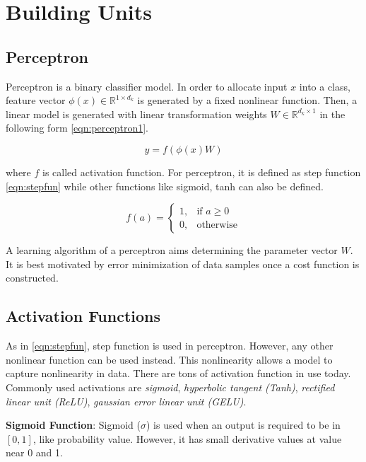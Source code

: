 \section{Building Units}
\label{sec:building_units}

\subsection{Perceptron}
Perceptron is a binary classifier model. In order to allocate input $x$ into a class, feature vector $\phi(x) \in \mathbb{R}^{1 \times d_k}$ is generated by a fixed nonlinear function. Then, a linear model is generated with linear transformation weights $W \in \mathbb{R}^{d_k \times 1} $ in the following form \ref{eqn:perceptron1}.

\begin{equation}
\label{eqn:perceptron1}
y = f(\phi(x) W)
\end{equation}

where $f$ is called activation function. For perceptron, it is defined as step function \ref{eqn:stepfun} while other functions like sigmoid, tanh can also be defined.

\begin{equation}
\label{eqn:stepfun}
f(a) = 
\begin{cases}
1,   & \text{if } a\geq 0\\
0,   & \text{otherwise}
\end{cases} 
\end{equation}

A learning algorithm of a perceptron aims determining the parameter vector $W$. It is best motivated by error minimization of data samples once a cost function is constructed. 

\subsection{Activation Functions}
As in \eqref{eqn:stepfun}, step function is used in perceptron. However, any other nonlinear function can be used instead. This nonlinearity allows a model to capture nonlinearity in data. There are tons of activation function in use today. Commonly used activations are \textit{sigmoid}, \textit{hyperbolic tangent (Tanh)}, \textit{rectified linear unit (ReLU)}, \textit{gaussian error linear unit (GELU)}.

\textbf{Sigmoid Function}: Sigmoid ($\sigma$) is used when an output is required to be in $[0,1]$, like probability value. However, it has small derivative values at value near 0 and 1. 

